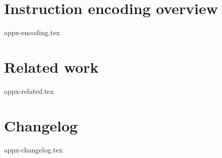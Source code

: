 \documentclass{article}
\begin{document}
\newpage
\section{Instruction encoding overview} 
\label{appx:encoding}

{appx-encoding.tex}

\newpage
\section{Related work}
\label{appx:related}

{appx-related.tex}

\newpage
\section{Changelog}
\label{appx:changelog}

{appx-changelog.tex}

\end{document}

